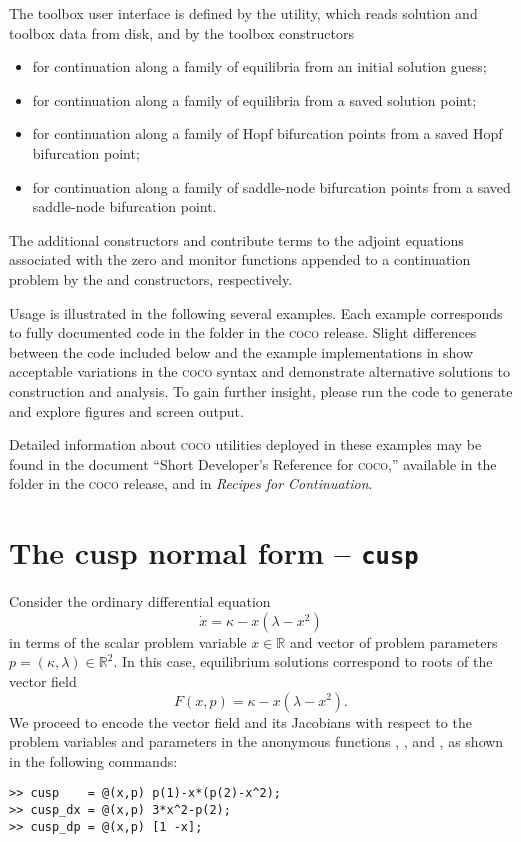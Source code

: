 The toolbox user interface is defined by the  utility, which reads solution and toolbox data from disk, and by the toolbox constructors
\begin{itemize}
\item {} for continuation along a family of equilibria from an initial solution guess;
\item {} for continuation along a family of equilibria from a saved solution point;
\item {} for continuation along a family of Hopf bifurcation points from a saved Hopf bifurcation point;
\item {} for continuation along a family of saddle-node bifurcation points from a saved saddle-node bifurcation point.
\end{itemize}
The additional constructors  and  contribute terms to the adjoint equations associated with the zero and monitor functions appended to a continuation problem by the  and  constructors, respectively. 

Usage is illustrated in the following several examples. Each example corresponds to fully documented code in the  folder in the \textsc{coco} release. Slight differences between the code included below and the example implementations in  show acceptable variations in the \textsc{coco} syntax and demonstrate alternative solutions to construction and analysis. To gain further insight, please run the code to generate and explore figures and screen output.

Detailed information about \textsc{coco} utilities deployed in these examples may be found in the document ``Short Developer's Reference for \textsc{coco},'' available in the  folder in the \textsc{coco} release, and in \emph{Recipes for Continuation}.



\section{The cusp normal form -- \texttt{cusp}}
Consider the ordinary differential equation
\begin{equation}
\dot{x}=\kappa-x\left(\lambda-x^2\right)
\end{equation}
in terms of the scalar problem variable $x\in\mathbb{R}$ and vector of problem parameters $p=(\kappa,\lambda)\in\mathbb{R}^2$. In this case, equilibrium solutions correspond to roots of the vector field
\begin{equation}
F(x,p)=\kappa-x\left(\lambda-x^2\right).
\end{equation}
We proceed to encode the vector field and its Jacobians with respect to the problem variables and parameters in the anonymous functions , , and , as shown in the following commands:
\begin{lstlisting}[language=coco-highlight]
>> cusp    = @(x,p) p(1)-x*(p(2)-x^2);
>> cusp_dx = @(x,p) 3*x^2-p(2);
>> cusp_dp = @(x,p) [1 -x];
\end{lstlisting}

